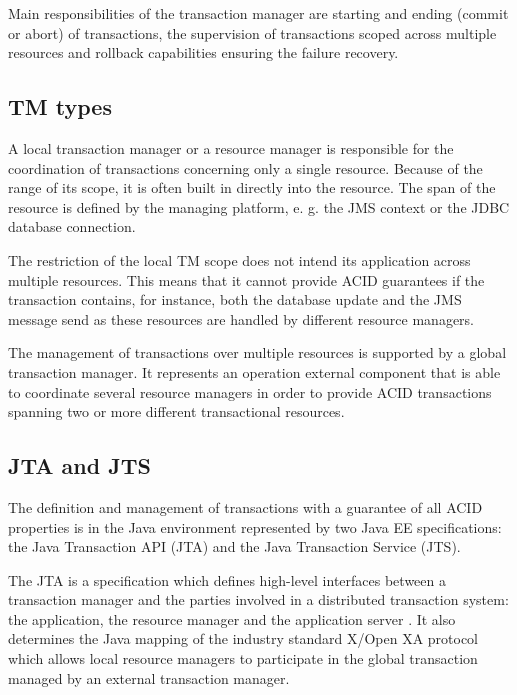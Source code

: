 \documentclass[oneside,
  digital, %
  table,   %
  nolof,     %
  nolot,     %
]{fithesis3}
\begin{document}
Main responsibilities of the transaction manager are starting and ending (commit or abort) of transactions, the supervision of transactions scoped across multiple resources and rollback capabilities ensuring the failure recovery. 


\subsection{TM types}

A local transaction manager or a resource manager is responsible for the coordination of transactions concerning only a single resource. Because of the range of its scope, it is often built in directly into the resource. The span of the resource is defined by the managing platform, e. g. the JMS context or the JDBC database connection.  

The restriction of the local TM scope does not intend its application across multiple resources. This means that it cannot provide ACID guarantees if the transaction contains, for instance, both the database update and the JMS message send as these resources are handled by different resource managers.

The management of transactions over multiple resources is supported by a global transaction manager. It represents an operation external component that is able to coordinate several resource managers in order to provide ACID transactions spanning two or more different transactional resources.

\subsection{JTA and JTS}

The definition and management of transactions with a guarantee of all ACID properties is in the Java environment represented by two Java EE specifications: the Java Transaction API (JTA) and the Java Transaction Service (JTS). 

The JTA is a specification which defines high-level interfaces between a transaction manager and the parties involved in a distributed transaction system: the application, the resource manager and the application server \cite{jta}. It also determines the Java mapping of the industry standard X/Open XA protocol which allows local resource managers to participate in the global transaction managed by an external transaction manager.
\end{document}
